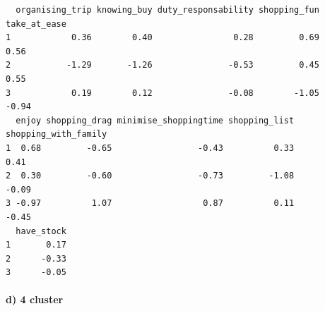 \documentclass[
  11pt,
]{article}
\newenvironment{Shaded}{\begin{snugshade}}{\end{snugshade}}
\newcommand{\AttributeTok}[1]{\textcolor[rgb]{0.77,0.63,0.00}{#1}}
\newcommand{\CommentTok}[1]{\textcolor[rgb]{0.56,0.35,0.01}{\textit{#1}}}
\newcommand{\ConstantTok}[1]{\textcolor[rgb]{0.00,0.00,0.00}{#1}}
\newcommand{\DecValTok}[1]{\textcolor[rgb]{0.00,0.00,0.81}{#1}}
\newcommand{\FunctionTok}[1]{\textcolor[rgb]{0.00,0.00,0.00}{#1}}
\newcommand{\NormalTok}[1]{#1}
\newcommand{\OtherTok}[1]{\textcolor[rgb]{0.56,0.35,0.01}{#1}}
\newcommand{\SpecialCharTok}[1]{\textcolor[rgb]{0.00,0.00,0.00}{#1}}
\newcommand{\StringTok}[1]{\textcolor[rgb]{0.31,0.60,0.02}{#1}}
\begin{document}
\begin{Shaded}
\end{Shaded}

\begin{verbatim}
  organising_trip knowing_buy duty_responsability shopping_fun take_at_ease
1            0.36        0.40                0.28         0.69         0.56
2           -1.29       -1.26               -0.53         0.45         0.55
3            0.19        0.12               -0.08        -1.05        -0.94
  enjoy shopping_drag minimise_shoppingtime shopping_list shopping_with_family
1  0.68         -0.65                 -0.43          0.33                 0.41
2  0.30         -0.60                 -0.73         -1.08                -0.09
3 -0.97          1.07                  0.87          0.11                -0.45
  have_stock
1       0.17
2      -0.33
3      -0.05
\end{verbatim}

\hypertarget{d-4-cluster}{%
\paragraph{d) 4 cluster}\label{d-4-cluster}}
\end{document}
